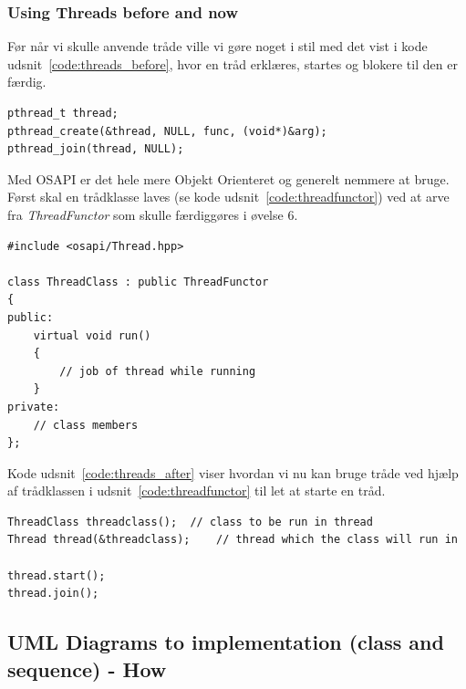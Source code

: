 \subsubsection{Using Threads before and now}
Før når vi skulle anvende tråde ville vi gøre noget i stil med det vist i kode udsnit~\ref{code:threads_before}, hvor en tråd erklæres, startes og blokere til den er færdig.

\begin{lstlisting}[caption=Anvendelse af tråde før OSAPI, label=code:threads_before]
pthread_t thread;
pthread_create(&thread, NULL, func, (void*)&arg);
pthread_join(thread, NULL);
\end{lstlisting}

Med OSAPI er det hele mere Objekt Orienteret og generelt nemmere at bruge. Først skal en trådklasse laves (se kode udsnit~\ref{code:threadfunctor}) ved at arve fra \textit{ThreadFunctor} som skulle færdiggøres i øvelse 6.

\begin{lstlisting}[caption=Trådklasse via nedarvning fra ThreadFunctor, label=code:threadfunctor]
#include <osapi/Thread.hpp>

class ThreadClass : public ThreadFunctor 
{
public:
	virtual void run() 
	{
		// job of thread while running
	}
private:
	// class members
};
\end{lstlisting}

Kode udsnit~\ref{code:threads_after} viser hvordan vi nu kan bruge tråde ved hjælp af trådklassen i udsnit~\ref{code:threadfunctor} til let at starte en tråd.

\begin{lstlisting}[caption=Anvendelse af tråde efter OSAPI,
label=code:threads_after,
morekeywords={ThreadClass, Thread, join, start}]
ThreadClass threadclass();	// class to be run in thread
Thread thread(&threadclass);	// thread which the class will run in

thread.start();
thread.join();
\end{lstlisting}

\subsection{UML Diagrams to implementation (class and sequence) - How}

